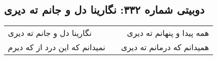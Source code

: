 \begin{center}
\section*{دوبیتی شماره ۳۳۲: نگارینا دل و جانم ته دیری}
\label{sec:332}
\begin{longtable}{l p{0.5cm} r}
نگارینا دل و جانم ته دیری
&&
همه پیدا و پنهانم ته دیری
\\
نمیدانم که این درد از که دیرم
&&
همیدانم که درمانم ته دیری
\\
\end{longtable}
\end{center}
